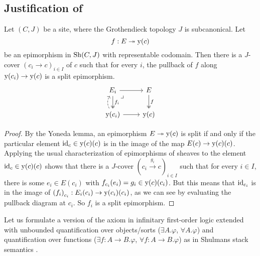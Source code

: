 \subsection{Justification of }

\begin{lemma}
  Let $(C, J)$ be a site,
  where the Grothendieck topology $J$ is subcanonical.
  Let
  \[ f : E \twoheadrightarrow \mathrm{y}(c) \]
  be an epimorphism in $\mathrm{Sh}(C, J)$ with representable codomain.
  Then there is a $J$-cover $(c_i \to c)_{i \in I}$ of $c$
  such that for every $i$,
  the pullback of $f$ along $\mathrm{y}(c_i) \to \mathrm{y}(c)$
  is a split epimorphism.
  \[ \begin{tikzcd}
    E_i \ar[r] \ar[d, two heads, "f_i"] \ar[dr, phantom, very near start, "\lrcorner"] &
    E \ar[d, two heads, "f"] \\
    \yo(c_i) \ar[r] \ar[u, bend left, dashed]&
    \yo(c)
  \end{tikzcd} \]
\end{lemma}

\begin{proof}
  By the Yoneda lemma,
  an epimorphism $E \twoheadrightarrow \mathrm{y}(c)$ is split
  if and only if
  the particular element $\mathrm{id}_c \in \mathrm{y}(c)(c)$
  is in the image of the map $E(c) \to \mathrm{y}(c)(c)$.
  Applying the usual characterization of epimorphisms of sheaves
  \cite[Corollary III.7.5]{maclane-moerdjik}
  to the element $\mathrm{id}_c \in \mathrm{y}(c)(c)$
  shows that there is a $J$-cover ${(c_i \xrightarrow{g_i} c)}_{i \in I}$
  such that for every $i \in I$,
  there is some $e_i \in E(c_i)$
  with $f_{c_i}(e_i) = g_i \in \mathrm{y}(c)(c_i)$.
  But this means that $\mathrm{id}_{c_i}$ is in the image of ${(f_i)}_{c_i} : E_i(c_i) \to \mathrm{y}(c_i)(c_i)$,
  as we can see by evaluating the pullback diagram at $c_i$.
  So $f_i$ is a split epimorphism.
\end{proof}

Let us formulate a version of the axiom 
in infinitary first-order logic extended with
unbounded quantification over objects/sorts
($\exists A. \varphi$, $\forall A. \varphi$)
and quantification over functions
($\exists f : A \to B. \varphi$, $\forall f : A \to B. \varphi$)
as in Shulmans stack semantics \cite[Section 7]{shulman-stack-semantics}.

